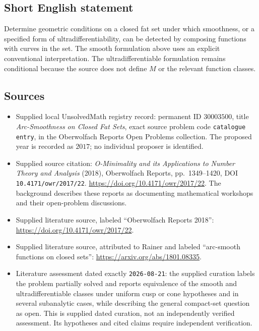 \documentclass[11pt]{article}
\begin{document}
\subsection{Short English statement}
Determine geometric conditions on a closed fat set under which smoothness, or a specified form of ultradifferentiability, can be detected by composing functions with curves in the set. The smooth formulation above uses an explicit conventional interpretation. The ultradifferentiable formulation remains conditional because the source does not define \(M\) or the relevant function classes.
\subsection{Sources}
\begin{itemize}
\item Supplied local UnsolvedMath registry record: permanent ID \(30003500\), title \emph{Arc-Smoothness on Closed Fat Sets}, exact source problem code \texttt{catalogue entry}, in the Oberwolfach Reports Open Problems collection. The proposed year is recorded as \(2017\); no individual proposer is identified.
\item Supplied source citation: \emph{O-Minimality and its Applications to Number Theory and Analysis} (2018), Oberwolfach Reports, pp.~1349--1420, DOI \texttt{10.4171/owr/2017/22}. \url{https://doi.org/10.4171/owr/2017/22}. The background describes these reports as documenting mathematical workshops and their open-problem discussions.
\item Supplied literature source, labeled ``Oberwolfach Reports 2018'': \url{https://doi.org/10.4171/owr/2017/22}.
\item Supplied literature source, attributed to Rainer and labeled ``arc-smooth functions on closed sets'': \url{https://arxiv.org/abs/1801.08335}.
\item Literature assessment dated exactly \texttt{2026-08-21}: the supplied curation labels the problem partially solved and reports equivalence of the smooth and ultradifferentiable classes under uniform cusp or cone hypotheses and in several subanalytic cases, while describing the general compact-set question as open. This is supplied dated curation, not an independently verified assessment. Its hypotheses and cited claims require independent verification.
\end{itemize}
\end{document}
